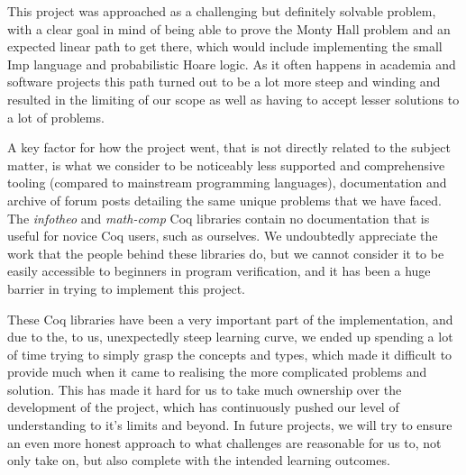 
This project was approached as a challenging but definitely solvable problem, with a clear goal in mind of being able to prove the Monty Hall problem and an expected linear path to get there, which would include implementing the small Imp language and probabilistic Hoare logic. As it often happens in academia and software projects this path turned out to be a lot more steep and winding and resulted in the limiting of our scope as well as having to accept lesser solutions to a lot of problems. 

A key factor for how the project went, that is not directly related to the subject matter, is what we consider to be noticeably less supported and comprehensive tooling (compared to mainstream programming languages), documentation and archive of forum posts detailing the same unique problems that we have faced. The \textit{infotheo} and \textit{math-comp} Coq libraries contain no documentation that is useful for novice Coq users, such as ourselves. We undoubtedly appreciate the work that the people behind these libraries do, but we cannot consider it to be easily accessible to beginners in program verification, and it has been a huge barrier in trying to implement this project. %

These Coq libraries have been a very important part of the implementation, and due to the, to us, unexpectedly steep learning curve, we ended up spending a lot of time trying to simply grasp the concepts and types, which made it difficult to provide much when it came to realising the more complicated problems and solution.
This has made it hard for us to take much ownership over the development of the project, which has continuously pushed our level of understanding to it's limits and beyond. In future projects, we will try to ensure an even more honest approach to what challenges are reasonable for us to, not only take on, but also complete with the intended learning outcomes. 

